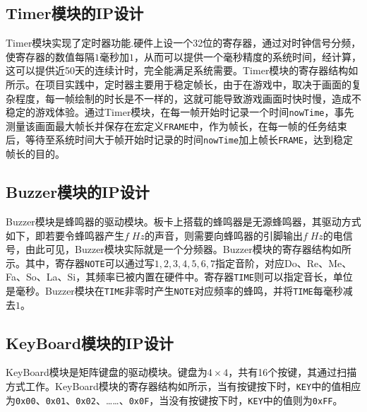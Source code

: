 



\subsection{Timer模块的IP设计}
Timer模块实现了定时器功能.硬件上设一个32位的寄存器，通过对时钟信号分频，使寄存器的数值每隔$1$毫秒加$1$，从而可以提供一个毫秒精度的系统时间，经计算，这可以提供近50天的连续计时，完全能满足系统需要。Timer模块的寄存器结构如所示。在项目实践中，定时器主要用于稳定帧长，由于在游戏中，取决于画面的复杂程度，每一帧绘制的时长是不一样的，这就可能导致游戏画面时快时慢，造成不稳定的游戏体验。通过Timer模块，在每一帧开始时记录一个时间\texttt{nowTime}，事先测量该画面最大帧长并保存在宏定义\texttt{FRAME}中，作为帧长，在每一帧的任务结束后，等待至系统时间大于帧开始时记录的时间\texttt{nowTime}加上帧长\texttt{FRAME}，达到稳定帧长的目的。





\subsection{Buzzer模块的IP设计}
Buzzer模块是蜂鸣器的驱动模块。板卡上搭载的蜂鸣器是无源蜂鸣器，其驱动方式如下，即若要令蜂鸣器产生$f\;\si{Hz}$的声音，则需要向蜂鸣器的引脚输出$f\;\si{Hz}$的电信号，由此可见，Buzzer模块实际就是一个分频器。Buzzer模块的寄存器结构如所示。其中，寄存器\texttt{NOTE}可以通过写$1,2,3,4,5,6,7$指定音阶，对应Do、Re、Me、Fa、So、La、Si，其频率已被内置在硬件中。寄存器\texttt{TIME}则可以指定音长，单位是毫秒。Buzzer模块在\texttt{TIME}非零时产生\texttt{NOTE}对应频率的蜂鸣，并将\texttt{TIME}每毫秒减去$1$。


\subsection{KeyBoard模块的IP设计}
KeyBoard模块是矩阵键盘的驱动模块。键盘为$4\times 4$，共有16个按键，其通过扫描方式工作。KeyBoard模块的寄存器结构如所示，当有按键按下时，\texttt{KEY}中的值相应为\texttt{0x00}、\texttt{0x01}、\texttt{0x02}、……、\texttt{0x0F}，当没有按键按下时，\texttt{KEY}中的值则为\texttt{0xFF}。

